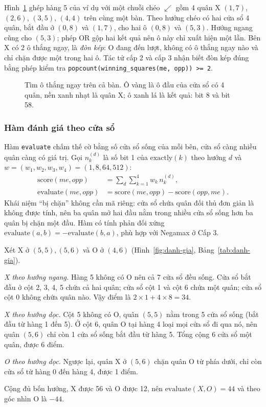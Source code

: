Hình~\ref{fig:o-thang} ghép hàng 5 của ví dụ với một chuỗi chéo $\swarrow$ gồm 4 quân X $(1,7)$, $(2,6)$, $(3,5)$, $(4,4)$ trên cùng một bàn. Theo hướng chéo có hai cửa sổ 4 quân, bắt đầu ở $(0,8)$ và $(1,7)$, cho hai ô $(0,8)$ và $(5,3)$. Hướng ngang cũng cho $(5,3)$; phép OR gộp hai kết quả nên ô này chỉ xuất hiện một lần. Bên X có 2 ô thắng ngay, là \emph{đòn kép}: O đang đến lượt, không có ô thắng ngay nào và chỉ chặn được một trong hai ô. Tác tử cấp 2 và cấp 3 nhận biết đòn kép đúng bằng phép kiểm tra \texttt{popcount(winning\_squares(me, opp)) >= 2}.

\begin{figure}[H]
  \centering
  
  \caption{Tìm ô thắng ngay trên cả bàn. Ô vàng là ô đầu của cửa sổ có 4 quân, nền xanh nhạt là quân X; ô xanh lá là kết quả: bit 8 và bit 58.}
  \label{fig:o-thang}
\end{figure}

\subsubsection{Hàm đánh giá theo cửa sổ}
Hàm \texttt{evaluate} chấm thế cờ bằng số cửa sổ sống của mỗi bên, cửa sổ càng nhiều quân càng có giá trị. Gọi $n_k^{(d)}$ là số bit 1 của $\mathrm{exactly}(k)$ theo hướng $d$ và $w = (w_1, w_2, w_3, w_4) = (1, 8, 64, 512)$:
\begin{align}
  \mathrm{score}(\mathit{me}, \mathit{opp}) &= \sum_{d} \sum_{k=1}^{4} w_k\, n_k^{(d)}, \\
  \mathrm{evaluate}(\mathit{me}, \mathit{opp}) &= \mathrm{score}(\mathit{me}, \mathit{opp}) - \mathrm{score}(\mathit{opp}, \mathit{me}).
\end{align}
Khái niệm ``bị chặn'' không cần mã riêng: cửa sổ chứa quân đối thủ đơn giản là không được tính, nên ba quân mở hai đầu nằm trong nhiều cửa sổ sống hơn ba quân bị chặn một đầu. Hàm có tính phản đối xứng $\mathrm{evaluate}(a, b) = -\mathrm{evaluate}(b, a)$, phù hợp với Negamax ở Cấp 3.

\begin{vidu}
Xét X ở $(5,5), (5,6)$ và O ở $(4,6)$ (Hình~\ref{fig:danh-gia}, Bảng~\ref{tab:danh-gia}).

\emph{X theo hướng ngang.} Hàng 5 không có O nên cả 7 cửa sổ đều sống. Cửa sổ bắt đầu ở cột 2, 3, 4, 5 chứa cả hai quân; cửa sổ cột 1 và cột 6 chứa một quân; cửa sổ cột 0 không chứa quân nào. Vậy điểm là $2 \times 1 + 4 \times 8 = 34$.

\emph{X theo hướng dọc.} Cột 5 không có O, quân $(5,5)$ nằm trong 5 cửa sổ sống (bắt đầu từ hàng 1 đến 5). Ở cột 6, quân O tại hàng 4 loại mọi cửa sổ đi qua nó, nên quân $(5,6)$ chỉ còn 1 cửa sổ sống bắt đầu từ hàng 5. Tổng cộng 6 cửa sổ một quân, được 6 điểm.

\emph{O theo hướng dọc.} Ngược lại, quân X ở $(5,6)$ chặn quân O từ phía dưới, chỉ còn cửa sổ từ hàng 0 đến hàng 4, được 1 điểm.

Cộng đủ bốn hướng, X được 56 và O được 12, nên $\mathrm{evaluate}(X, O) = 44$ và theo góc nhìn O là $-44$.
\end{vidu}

